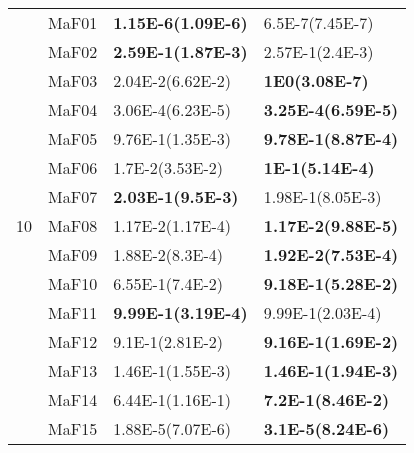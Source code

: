 \documentclass[]{article}
\begin{document}
\begin{table}
\begin{footnotesize}
\begin{tabular}{|l|l|l|l|}
\multirow{15}{*}{10} & MaF01 & \cellcolor{gray95} {\bf 1.15E-6(1.09E-6)} & \cellcolor{gray95} 6.5E-7(7.45E-7)\\
 & MaF02 & \cellcolor{gray95} {\bf 2.59E-1(1.87E-3)} & 2.57E-1(2.4E-3)\\
 & MaF03 & 2.04E-2(6.62E-2) & \cellcolor{gray95} {\bf 1E0(3.08E-7)}\\
 & MaF04 & \cellcolor{gray95} 3.06E-4(6.23E-5) & \cellcolor{gray95} {\bf 3.25E-4(6.59E-5)}\\
 & MaF05 & 9.76E-1(1.35E-3) & \cellcolor{gray95} {\bf 9.78E-1(8.87E-4)}\\
 & MaF06 & 1.7E-2(3.53E-2) & \cellcolor{gray95} {\bf 1E-1(5.14E-4)}\\
 & MaF07 & \cellcolor{gray95} {\bf 2.03E-1(9.5E-3)} & 1.98E-1(8.05E-3)\\
 & MaF08 & \cellcolor{gray95} 1.17E-2(1.17E-4) & \cellcolor{gray95} {\bf 1.17E-2(9.88E-5)}\\
 & MaF09 & 1.88E-2(8.3E-4) & \cellcolor{gray95} {\bf 1.92E-2(7.53E-4)}\\
 & MaF10 & 6.55E-1(7.4E-2) & \cellcolor{gray95} {\bf 9.18E-1(5.28E-2)}\\
 & MaF11 & \cellcolor{gray95} {\bf 9.99E-1(3.19E-4)} & \cellcolor{gray95} 9.99E-1(2.03E-4)\\
 & MaF12 & 9.1E-1(2.81E-2) & \cellcolor{gray95} {\bf 9.16E-1(1.69E-2)}\\
 & MaF13 & \cellcolor{gray95} 1.46E-1(1.55E-3) & \cellcolor{gray95} {\bf 1.46E-1(1.94E-3)}\\
 & MaF14 & 6.44E-1(1.16E-1) & \cellcolor{gray95} {\bf 7.2E-1(8.46E-2)}\\
 & MaF15 & 1.88E-5(7.07E-6) & \cellcolor{gray95} {\bf 3.1E-5(8.24E-6)}\\
\hline


\end{tabular}
\end{footnotesize}
\end{table}
\end{document}
